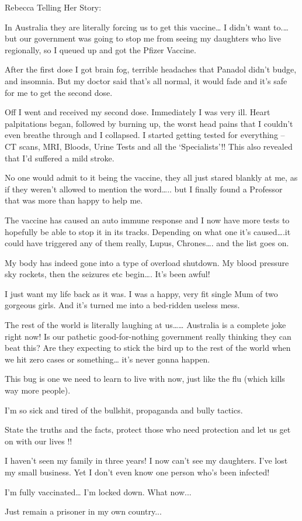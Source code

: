 Rebecca Telling Her Story:

In Australia they are literally forcing us to get this vaccine… I didn’t want
to.… but our government was going to stop me from seeing my daughters who live
regionally, so I queued up and got the Pfizer Vaccine.

After the first dose I got brain fog, terrible headaches that Panadol didn’t
budge, and insomnia. But my doctor said that’s all normal, it would fade and
it’s safe for me to get the second dose.

Off I went and received my second dose. Immediately I was very ill. Heart
palpitations began, followed by burning up, the worst head pains that I couldn’t
even breathe through and I collapsed. I started getting tested for everything –
CT scans, MRI, Bloods, Urine Tests and all the ‘Specialists’!! This also
revealed that I’d suffered a mild stroke.

No one would admit to it being the vaccine, they all just stared blankly at me,
as if they weren’t allowed to mention the word….. but I finally found a
Professor that was more than happy to help me.

The vaccine has caused an auto immune response and I now have more tests to
hopefully be able to stop it in its tracks. Depending on what one it’s
caused….it could have triggered any of them really, Lupus, Chrones…. and the
list goes on.

My body has indeed gone into a type of overload shutdown. My blood pressure sky
rockets, then the seizures etc begin…. It’s been awful!

I just want my life back as it was. I was a happy, very fit single Mum of two
gorgeous girls. And it’s turned me into a bed-ridden useless mess.

The rest of the world is literally laughing at us…… Australia is a complete joke
right now! Is our pathetic good-for-nothing government really thinking they can
beat this? Are they expecting to stick the bird up to the rest of the world when
we hit zero cases or something… it’s never gonna happen.

This bug is one we need to learn to live with now, just like the flu (which
kills way more people).

I’m so sick and tired of the bullshit, propaganda and bully tactics.

State the truths and the facts, protect those who need protection and let us get
on with our lives !!

I haven’t seen my family in three years! I now can’t see my daughters. I’ve lost
my small business. Yet I don’t even know one person who’s been infected!

I’m fully vaccinated… I’m locked down. What now...

Just remain a prisoner in my own country...

